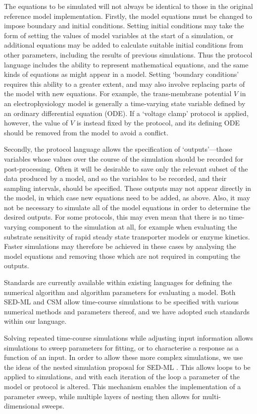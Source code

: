 \documentclass[preprint,authoryear,12pt]{elsarticle}
\begin{document}
The equations to be simulated will not always be identical to those in the original reference model implementation.
Firstly, the model equations must be changed to impose boundary and initial conditions.
Setting initial conditions may take the form of setting the values of model variables at the start of a simulation, or additional equations may be added to calculate suitable initial conditions from other parameters, including the results of previous simulations.
Thus the protocol language includes the ability to represent mathematical equations, and the same kinds of equations as might appear in a model.
Setting `boundary conditions' requires this ability to a greater extent, and may also involve replacing parts of the model with new equations.
For example, the trans-membrane potential $V$ in an electrophysiology model is generally a time-varying state variable defined by an ordinary differential equation (ODE).
If a `voltage clamp' protocol is applied, however, the value of $V$ is instead fixed by the protocol, and its defining ODE should be removed from the model to avoid a conflict.


Secondly, the protocol language allows the specification of `outputs'---those variables whose values over the course of the simulation should be recorded for post-processing.
Often it will be desirable to save only the relevant subset of the data produced by a model, and so the variables to be recorded, and their sampling intervals, should be specified.
These outputs may not appear directly in the model, in which case new equations need to be added, as above.
Also, it may not be necessary to simulate all of the model equations in order to determine the desired outputs.
For some protocols, this may even mean that there is no time-varying component to the simulation at all, for example when evaluating the substrate sensitivity of rapid steady state transporter models or enzyme kinetics.
Faster simulations may therefore be achieved in these cases by analysing the model equations and removing those which are not required in computing the outputs.


Standards are currently available within existing languages for defining the numerical algorithm and algorithm parameters for evaluating a model.
Both SED-ML and CSM allow time-course simulations to be specified with various numerical methods and parameters thereof, and we have adopted such standards within our language.


Solving repeated time-course simulations while adjusting input information allows
simulations to sweep parameters for fitting, or to characterise a response as a
function of an input.
In order to allow these more complex simulations, we use the
ideas of the nested simulation proposal for SED-ML \citep{Bergmann.10:Simple}.
This allows loops to be applied to simulations, and with each iteration of the
loop a parameter of the model or protocol is altered.
This mechanism enables the
implementation of a parameter sweep, while multiple layers of nesting then
allows for multi-dimensional sweeps.
\end{document}
